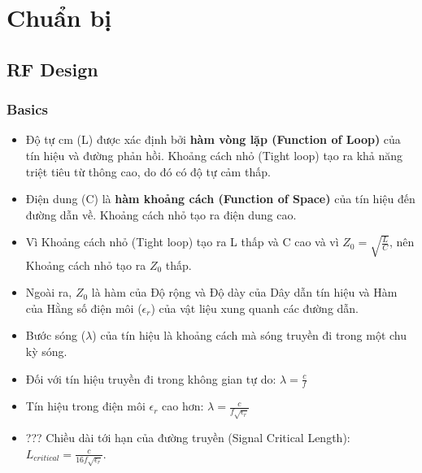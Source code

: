 \chapter{Chuẩn bị}
    \section{RF Design}
        \subsection{Basics}
            \begin{itemize}
                \item Độ tự cm (L) được xác định bởi \textbf{hàm vòng lặp (Function of Loop)} của tín hiệu và đường phản hồi.
                Khoảng cách nhỏ (Tight loop) tạo ra khả năng triệt tiêu từ thông cao, do đó có độ tự cảm thấp.
                \item Điện dung (C) là \textbf{hàm khoảng cách (Function of Space)} của tín hiệu đến đường dẫn về. Khoảng cách nhỏ tạo ra điện dung cao.
                \item Vì Khoảng cách nhỏ (Tight loop) tạo ra L thấp và C cao và vì $Z_0 = \sqrt{\frac{L}{C}}$, nên Khoảng cách nhỏ tạo ra $Z_0$ thấp.
                \item Ngoài ra, $Z_0$ là hàm của Độ rộng và Độ dày của Dây dẫn tín hiệu và Hàm của Hằng số điện môi ($\epsilon_r$) của vật liệu xung quanh các đường dẫn.
                \item Bước sóng ($\lambda$) của tín hiệu là khoảng cách mà sóng truyền đi trong một chu kỳ sóng.
                \item Đối với tín hiệu truyền đi trong không gian tự do: $\lambda = \frac{c}{f}$
                \item Tín hiệu trong điện môi $\epsilon_r$ cao hơn: $\lambda = \frac{c}{f\sqrt{\epsilon_r}}$
                \item ??? Chiều dài tới hạn của đường truyền (Signal Critical Length): $L_{critical} = \frac{c}{16f\sqrt{\epsilon_r}}$.
            \end{itemize}

            \newpage
